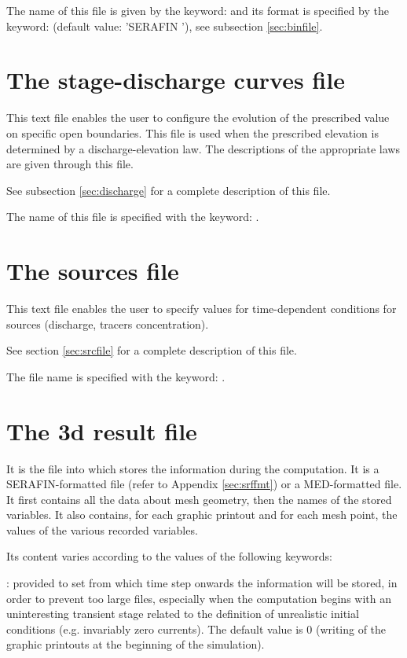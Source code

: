 The name of this file is given by the keyword:  and its
format is specified by the keyword:  (default
value: 'SERAFIN '), see subsection \ref{sec:binfile}.


\section{The stage-discharge curves file}

This text file enables the user to configure the evolution of the prescribed
value on specific open boundaries. This file is used when the prescribed
elevation is determined by a discharge-elevation law. The descriptions of the
appropriate laws are given through this file.

See subsection \ref{sec:discharge} for a complete description of this file.

The name of this file is specified with the keyword: .


\section{The sources file}

This text file enables the user to specify values for time-dependent conditions
for sources (discharge, tracers concentration).

See section \ref{sec:srcfile} for a complete description of this file.

The file name is specified with the keyword: .


\section{The 3d result file}
\label{sec:3dres}
It is the file into which  stores the information during the
computation. It is a SERAFIN-formatted file (refer to Appendix
\ref{sec:srffmt}) or a MED-formatted file. It first contains all the data about
mesh geometry, then the names of the stored variables. It also contains, for
each graphic printout and for each mesh point, the values of the various
recorded variables.

Its content varies according to the values of the following keywords:

: provided to set from
which time step onwards the information will be stored, in order to prevent too
large files, especially when the computation begins with an uninteresting
transient stage related to the definition of unrealistic initial conditions
(e.g. invariably zero currents). The default value is 0 (writing of the graphic
printouts at the beginning of the simulation).

